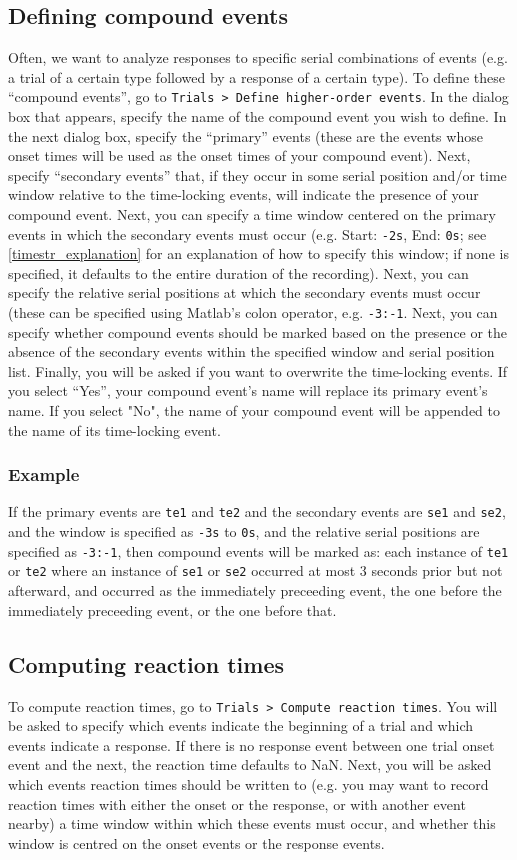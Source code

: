\documentclass{article}
\begin{document}
\subsection{Defining compound events}
Often, we want to analyze responses to specific serial combinations of events (e.g. a trial of a certain type followed by a response of a certain type). To define these ``compound events'', go to \texttt{Trials > Define higher-order events}. In the dialog box that appears, specify the name of the compound event you wish to define. In the next dialog box, specify the ``primary'' events (these are the events whose onset times will be used as the onset times of your compound event). Next, specify ``secondary events'' that, if they occur in some serial position and/or time window relative to the time-locking events, will indicate the presence of your compound event. Next, you can specify a time window centered on the primary events in which the secondary events must occur (e.g. Start: \texttt{-2s}, End: \texttt{0s}; see \ref{timestr_explanation} for an explanation of how to specify this window; if none is specified, it defaults to the entire duration of the recording).  Next, you can specify the relative serial positions at which the secondary events must occur (these can be specified using Matlab's colon operator, e.g. \texttt{-3:-1}. Next, you can specify whether compound events should be marked based on the presence or the absence of the secondary events within the specified window and serial position list. Finally, you will be asked if you want to overwrite the time-locking events. If you select ``Yes'', your compound event's name will replace its primary event's name. If you select "No", the name of your compound event will be appended to the name of its time-locking event.
\subsubsection{Example}
If the primary events are \texttt{te1} and \texttt{te2} and the secondary events are \texttt{se1} and \texttt{se2}, and the window is specified as \texttt{-3s} to \texttt{0s}, and the relative serial positions are specified as \texttt{-3:-1}, then compound events will be marked as: each instance of \texttt{te1} or \texttt{te2} where an instance of \texttt{se1} or \texttt{se2} occurred at most 3 seconds prior but not afterward, and occurred as the immediately preceeding event, the one before the immediately preceeding event, or the one before that.
\subsection{Computing reaction times}
To compute reaction times, go to \texttt{Trials > Compute reaction times}. You will be asked to specify which events indicate the beginning of a trial and which events indicate a response. If there is no response event between one trial onset event and the next, the reaction time defaults to NaN. Next, you will be asked which events reaction times should be written to (e.g. you may want to record reaction times with either the onset or the response, or with another event nearby) a time window within which these events must occur, and whether this window is centred on the onset events or the response events.
\end{document}
